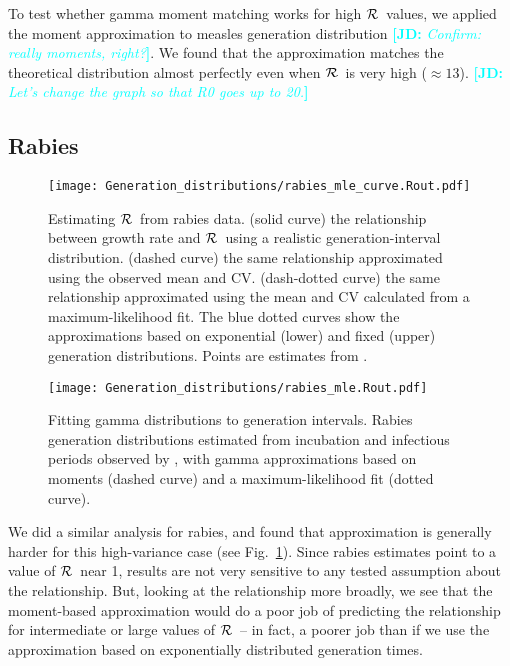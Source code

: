 \documentclass[12pt,]{article}
\newcommand{\RR}{\ensuremath{{\cal R}}}
\newcommand{\fref}[1]{Fig.~\ref{fig:#1}}
\newcommand{\comment}[3]{\textcolor{#1}{\textbf{[#2: }\textit{#3}\textbf{]}}}
\newcommand{\jd}[1]{\comment{cyan}{JD}{#1}}
\begin{document}
To test whether gamma moment matching works for high \RR\ values, we applied the moment approximation to measles generation distribution \jd{Confirm: really moments, right?}. We found that the approximation matches the theoretical distribution almost perfectly even when \RR\ is very high ($\approx 13$). \jd{Let's change the graph so that R0 goes up to 20.}

\subsection{Rabies}

\begin{figure}[htbp] \centering
	\texttt{[image: Generation\_distributions/rabies\_mle\_curve.Rout.pdf]}
	\caption{Estimating \RR~from rabies data.
		(solid curve) the relationship between growth rate and \RR~using a realistic generation-interval distribution.
		(dashed curve) the same relationship approximated using the observed mean and CV.
		(dash-dotted curve) the same relationship approximated using the mean and CV calculated from a maximum-likelihood fit.
		The blue dotted curves show the approximations based on exponential (lower) and fixed (upper) generation distributions.
		Points are estimates from \cite{HampDush09}.
	}
	\label{fig:rabiesCurve}
\end{figure}

\begin{figure}[htbp] \centering
	\texttt{[image: Generation\_distributions/rabies\_mle.Rout.pdf]}
	\caption{
		Fitting gamma distributions to generation intervals. 
		Rabies generation distributions estimated from incubation and infectious periods observed by \cite{HampDush09}, with gamma approximations based on moments (dashed curve) and a maximum-likelihood fit (dotted curve).
	}
	\label{fig:rabiesHist}
\end{figure}

We did a similar analysis for rabies, and found that approximation is generally harder for this high-variance case (see \fref{rabiesCurve}). Since rabies estimates point to a value of \RR\ near 1, results are not very sensitive to any tested assumption about the relationship. But, looking at the relationship more broadly, we see that the moment-based approximation would do a poor job of predicting the relationship for intermediate or large values of \RR\ -- in fact, a poorer job than if we use the approximation based on exponentially distributed generation times. 
\end{document}
